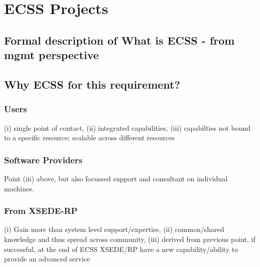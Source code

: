 \documentclass{sig-alternate}
\begin{document}
\section{ECSS Projects}

\subsection{Formal description of What is ECSS - from mgmt perspective}

\subsection{Why ECSS for this requirement?}


\subsubsection{Users} (i) single point of contact, (ii) integrated capabilities,
(iii) capabilties not bound to a specific resource; scalable across
different resources

\subsubsection{Software Providers} Point (iii) above, but also focussed support and
consultant on individual machines.

\subsubsection{From XSEDE-RP} (i) Gain more than system level support/expertise, (ii)
common/shared knowledge and thus spread across community, (iii)
derived from previous point, if successful, at the end of ECSS
XSEDE/RP have a new capability/ability to provide an advanced service
\end{document}
